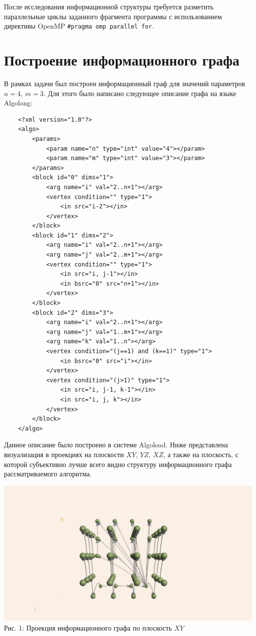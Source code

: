     После исследования информационной структуры требуется разметить параллельные циклы заданного фрагмента программы с использованием директивы OpenMP \texttt{\#pragma omp parallel for}.

    
    \section{Построение информационного графа}
    В рамках задачи был построен информационный граф для значений параметров $n=4$, $m=3$.
    Для этого было написано следующее описание графа на языке Algolang:
    \begin{verbatim}
    <?xml version="1.0"?>
    <algo>
        <params>
            <param name="n" type="int" value="4"></param>
            <param name="m" type="int" value="3"></param>
        </params>
        <block id="0" dims="1">
            <arg name="i" val="2..n+1"></arg>
            <vertex condition="" type="1">
                <in src="i-2"></in>
            </vertex>
        </block>
        <block id="1" dims="2">
            <arg name="i" val="2..n+1"></arg>
            <arg name="j" val="2..m+1"></arg>
            <vertex condition="" type="1">
                <in src="i, j-1"></in>
                <in bsrc="0" src="n+1"></in>
            </vertex>
        </block>
        <block id="2" dims="3">
            <arg name="i" val="2..n+1"></arg>
            <arg name="j" val="1..m+1"></arg>
            <arg name="k" val="1..n"></arg>
            <vertex condition="(j==1) and (k==1)" type="1">
                <in bsrc="0" src="i"></in>
            </vertex>
            <vertex condition="(j>1)" type="1">
                <in src="i, j-1, k-1"></in>
                <in src="i, j, k"></in>
            </vertex>
        </block>
    </algo>
    \end{verbatim}

    Данное описание было построено в системе Algoload.
    Ниже представлена визуализация в проекциях на плоскости $XY$, $YZ$, $XZ$, а также на плоскость, с которой субъективно лучше всего видно структуру информационного графа рассматриваемого алгоритма.
    \clearpage
    \begin{center}
        \includegraphics[width=0.9\linewidth]{graph_xy.png}
        \newline
        Рис. 1: Проекция информационного графа по плоскость $XY$
    \end{center}
    
